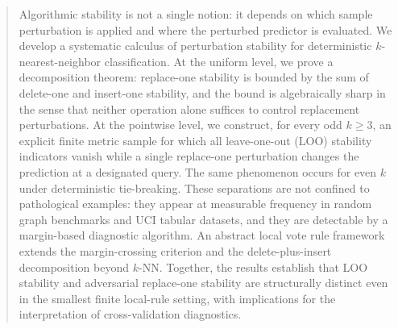 \begin{abstract}
Algorithmic stability is not a single notion: it depends on which sample
perturbation is applied and where the perturbed predictor is evaluated. We
develop a systematic calculus of perturbation stability for deterministic
$k$-nearest-neighbor classification. At the uniform level, we prove a
decomposition theorem: replace-one stability is bounded by the sum of
delete-one and insert-one stability, and the bound is algebraically sharp in
the sense that neither operation alone suffices to control replacement
perturbations. At the pointwise level, we construct, for every odd $k \ge 3$,
an explicit finite metric sample for which all leave-one-out (LOO) stability
indicators vanish while a single replace-one perturbation changes the
prediction at a designated query. The same phenomenon occurs for even $k$
under deterministic tie-breaking. These separations are not confined to
pathological examples: they appear at measurable frequency in random graph
benchmarks and UCI tabular datasets, and they are detectable by a
margin-based diagnostic algorithm. An abstract local vote rule framework
extends the margin-crossing criterion and the delete-plus-insert decomposition
beyond $k$-NN. Together, the results establish that LOO stability and
adversarial replace-one stability are structurally distinct even in the
smallest finite local-rule setting, with implications for the interpretation
of cross-validation diagnostics.
\end{abstract}
